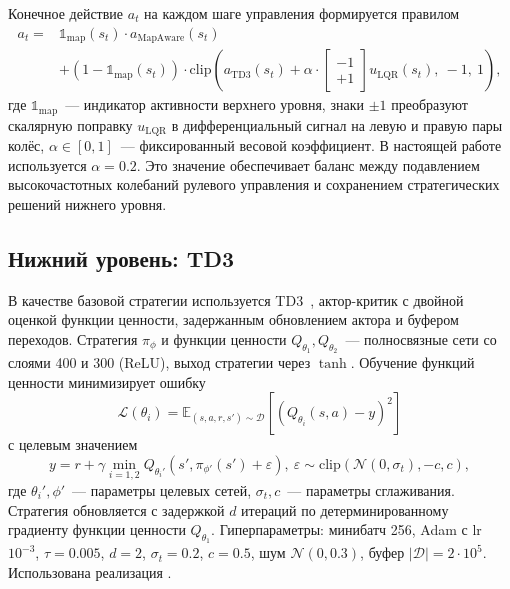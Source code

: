 \documentclass[11pt]{article}
\begin{document}
Конечное действие $a_t$ на каждом шаге управления формируется правилом
\begin{equation}
\label{eq:combine}
\begin{split}
a_t = {} & \mathbb{1}_{\mathrm{map}}(s_t) \cdot a_{\mathrm{MapAware}}(s_t) \\
& + (1 - \mathbb{1}_{\mathrm{map}}(s_t)) \cdot \mathrm{clip}\left( a_{\mathrm{TD3}}(s_t) + \alpha \cdot \begin{bmatrix} -1 \\ +1 \end{bmatrix} u_{\mathrm{LQR}}(s_t),\ -1,\ 1 \right),
\end{split}
\end{equation}
где $\mathbb{1}_{\text{map}}$~--- индикатор активности верхнего уровня,
знаки $\pm 1$ преобразуют скалярную поправку $u_{\mathrm{LQR}}$
в дифференциальный сигнал на левую и правую пары колёс, $\alpha \in [0, 1]$~---
фиксированный весовой коэффициент. В настоящей работе используется
$\alpha = 0.2$. Это значение обеспечивает баланс между подавлением
высокочастотных колебаний рулевого управления и сохранением стратегических
решений нижнего уровня.


\subsection{Нижний уровень: TD3}
\label{sec:reactive}

В качестве базовой стратегии используется TD3~\cite{fujimoto2018td3}, актор-критик с двойной оценкой функции ценности, задержанным обновлением актора и буфером переходов. Стратегия $\pi_\phi$ и функции ценности $Q_{\theta_1}, Q_{\theta_2}$~--- полносвязные сети со слоями 400 и 300 (ReLU), выход стратегии через $\tanh$. Обучение функций ценности минимизирует ошибку
\begin{equation}
\mathcal{L}(\theta_i) = \mathbb{E}_{(s,a,r,s') \sim \mathcal{D}}[(Q_{\theta_i}(s,a) - y)^2]
\end{equation}
с целевым значением
\begin{equation}
y = r + \gamma \min_{i=1,2} Q_{\theta_i'}(s', \pi_{\phi'}(s') + \varepsilon),\ \varepsilon \sim \mathrm{clip}(\mathcal{N}(0, \sigma_t), -c, c),
\end{equation}
где $\theta_i', \phi'$~--- параметры целевых сетей, $\sigma_t, c$~--- параметры сглаживания. Стратегия обновляется с задержкой $d$ итераций по детерминированному градиенту функции ценности $Q_{\theta_1}$.
Гиперпараметры: минибатч 256, Adam с lr $10^{-3}$, $\tau = 0.005$, $d = 2$, $\sigma_t = 0.2$, $c = 0.5$, шум $\mathcal{N}(0, 0.3)$, буфер $|\mathcal{D}| = 2 \cdot 10^5$. Использована реализация \cite{raffin2021sb3}.
\end{document}
